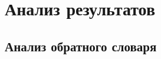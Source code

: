 \chapter{Анализ результатов} \label{chapt_results}

\section{Анализ обратного словаря} \label{sect_reverse_dict}

 


